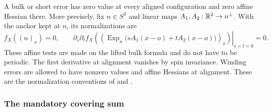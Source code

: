 A bulk or short error has zero value at every aligned configuration and
zero affine Hessian there.  More precisely, fix $n\in S^2$ and linear
maps $A_1,A_2:\mathbb R^2\to n^\perp$.  With the anchor kept at $n$, its
normalizations are
\begin{equation}
 f_X((n)_x)=0,
 \qquad
 \left.\partial_s\partial_t
 f_X\left(\left(
   \operatorname{Exp}_{n}\bigl(sA_1(x-o)+tA_2(x-o)\bigr)
                            \right)_x\right)
 \right|_{s=t=0}=0.
 \label{eq:setup-error-normalization}
\end{equation}
These affine tests are made on the lifted bulk formula and do not have
to be periodic.  The first derivative at alignment vanishes by spin
invariance.  Winding errors are allowed to have nonzero values and
affine Hessians at alignment.  These are the normalization conventions
of  and .

\subsubsection{The mandatory covering sum}

